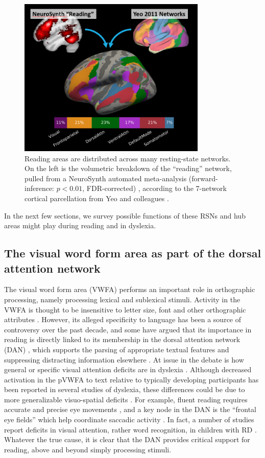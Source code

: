 \begin{figure}[t]
\centering
\includegraphics[height=3in]{images/ch1-yeo-to-neurosynth.png}
    \caption[Reading areas are distributed across many resting-state networks.]{Reading areas are distributed across many resting-state networks. On the left is the volumetric breakdown of the ``reading'' network, pulled from a NeuroSynth automated meta-analysis (forward-inference: $p < 0.01$, FDR-corrected) \citep{Yarkoni2011}, according to the 7-network cortical parcellation from Yeo and colleagues \citep{Yeo2011}.}
    \label{fig:ch1-yeo-to-neurosynth}
\end{figure}

In the next few sections, we survey possible functions of these RSNs and hub areas might play during reading and in dyslexia.  

\subsection{The visual word form area as part of the dorsal attention network} 
The visual word form area (VWFA) performs an important role in orthographic processing, namely processing lexical and sublexical stimuli. Activity in the VWFA is thought to be insensitive to letter size, font and other orthographic attributes \citep{Cohen2002}. However, its alleged specificity to language has been a source of controversy over the past decade, and some have argued that its importance in reading is directly linked to its membership in the dorsal attention network (DAN) \citep{Vogel2012a}, which supports the parsing of appropriate textual features and suppressing distracting information elsewhere \citep{Corbetta2002}. At issue in the debate is how general or specific visual attention deficits are in dyslexia \citep{Vogel2014}. Although decreased activation in the pVWFA to text relative to typically developing participants has been reported in several studies of dyslexia, these differences could be due to more generalizable visuo-spatial deficits  \citep{Richlan2009}. For example, fluent reading requires accurate and precise eye movements \citep{Rayner1978}, and a key node in the DAN is the ``frontal eye fields'' which help coordinate saccadic activity \citep{Connolly2002}. In fact, a number of studies report deficits in visual attention, rather word recognition, in children with RD \citep{Vidyasagar2010}.  Whatever the true cause, it is clear that the DAN provides critical support for reading, above and beyond simply processing stimuli.

